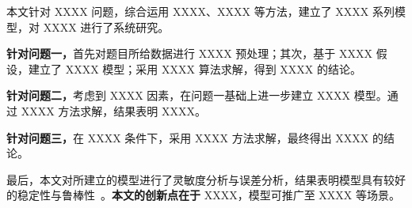 \thispagestyle{abstractstyle}

\abstracttitle

本文针对 XXXX 问题，综合运用 XXXX、XXXX 等方法，建立了 XXXX 系列模型，对 XXXX 进行了系统研究。

\textbf{针对问题一，}首先对题目所给数据进行 XXXX 预处理；其次，基于 XXXX 假设，建立了 XXXX 模型；采用 XXXX 算法求解，得到 XXXX 的结论。

\textbf{针对问题二，}考虑到 XXXX 因素，在问题一基础上进一步建立 XXXX 模型。通过 XXXX 方法求解，结果表明 XXXX。

\textbf{针对问题三，}在 XXXX 条件下，采用 XXXX 方法求解，最终得出 XXXX 的结论。

最后，本文对所建立的模型进行了灵敏度分析与误差分析，结果表明模型具有较好的稳定性与鲁棒性~\cite{jiang2011_modeling}。\textbf{本文的创新点在于} XXXX，模型可推广至 XXXX 等场景。

